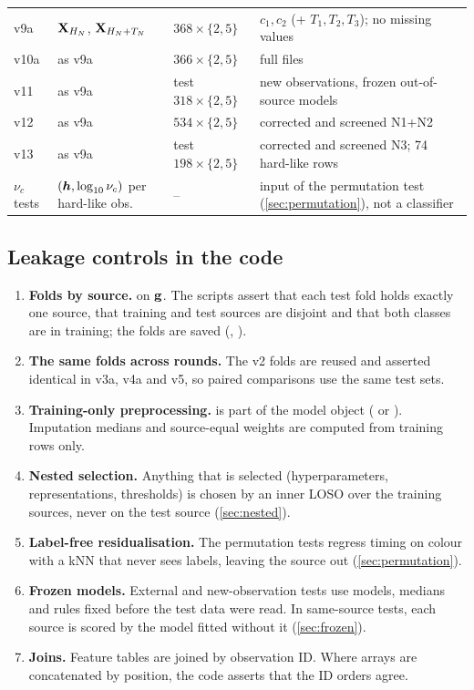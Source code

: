 {\begin{longtable}{@{}>{\raggedright\arraybackslash}p{1.25cm} >{\raggedright\arraybackslash}p{3.6cm} >{\raggedright\arraybackslash}p{3.4cm} >{\raggedright\arraybackslash}p{7.0cm}@{}}
v9a & $\mathbf{X}_{H_N}$, $\mathbf{X}_{H_N+T_N}$ & $368\times\{2,5\}$ & $c_1,c_2$ (+ $T_1,T_2,T_3$); no missing values \\
v10a & as v9a & $366\times\{2,5\}$ & full files \\
v11 & as v9a & test $318\times\{2,5\}$ & new observations, frozen out-of-source models \\
v12 & as v9a & $534\times\{2,5\}$ & corrected and screened N1+N2 \\
v13 & as v9a & test $198\times\{2,5\}$ & corrected and screened N3; 74 hard-like rows \\
$\nu_c$ tests & $(\bm{h},\log_{10}\nu_c)$ per hard-like obs. & -- & input of the permutation test (\cref{sec:permutation}), not a classifier \\
\end{longtable}}

\subsection{Leakage controls in the code}\label{sec:leakage}
\begin{enumerate}
\item \textbf{Folds by source.}  on $\mathbf{g}$. The scripts assert that each test fold holds exactly one
source, that training and test sources are disjoint and that both classes are in training; the folds are saved
(, ).
\item \textbf{The same folds across rounds.} The v2 folds are reused and asserted identical in v3a, v4a and v5, so paired
comparisons use the same test sets.
\item \textbf{Training-only preprocessing.}  is part of the model object ( or
). Imputation medians and source-equal weights are computed from training rows only.
\item \textbf{Nested selection.} Anything that is selected (hyperparameters, representations, thresholds) is chosen by an
inner LOSO over the training sources, never on the test source (\cref{sec:nested}).
\item \textbf{Label-free residualisation.} The permutation tests regress timing on colour with a kNN that never sees labels,
leaving the source out (\cref{sec:permutation}).
\item \textbf{Frozen models.} External and new-observation tests use models, medians and rules fixed before the test data
were read. In same-source tests, each source is scored by the model fitted without it (\cref{sec:frozen}).
\item \textbf{Joins.} Feature tables are joined by observation ID. Where arrays are concatenated by position, the code
asserts that the ID orders agree.
\end{enumerate}
